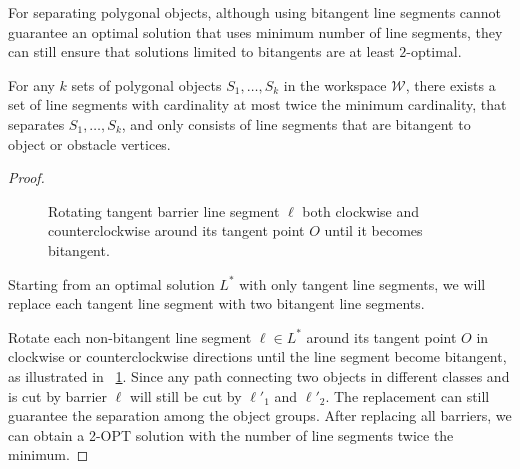 For separating polygonal objects, although using bitangent line segments cannot guarantee an optimal solution that uses minimum number of line segments, they can still ensure that solutions limited to bitangents are at least $2$-optimal.
\begin{proposition}
For any $k$ sets of polygonal objects $S_1, \dots, S_k$ in the workspace $\mathcal W$, there exists a set of line segments with cardinality at most twice the minimum cardinality, that separates $S_1, \dots, S_k$, and only consists of line segments that are bitangent to object or obstacle vertices. 
\end{proposition}
\begin{proof}


\begin{figure}[ht]
    \centering
{}
    \caption{Rotating tangent barrier line segment $\ell$ both clockwise and counterclockwise around its tangent point $O$ until it becomes bitangent.}
    \label{fig:proof_bi_2opt}
\end{figure}

Starting from an optimal solution $L^*$ with only tangent line segments,
we will replace each tangent line segment with two bitangent line segments.

Rotate each non-bitangent line segment $\ell\in L^*$ around its tangent point $O$ in clockwise or counterclockwise directions until the line segment become bitangent, as illustrated in ~\ref{fig:proof_bi_2opt}. 
Since any path connecting two objects in different classes and is cut by barrier $\ell$ will still be cut by $\ell'_1$ and $\ell'_2$.
The replacement can still guarantee the separation among the object groups.
After replacing all barriers, we can obtain a 2-OPT solution with the number of line segments twice the minimum.
\end{proof}

